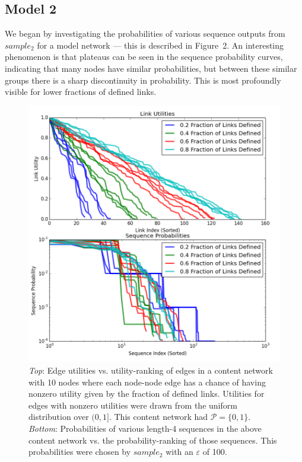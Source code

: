 \documentclass[preprint2]{aastex}
\begin{document}
\subsection{Model 2}

We began by investigating the probabilities of various sequence outputs from \(sample_2\) for a model network --- this is described in Figure~2. An interesting phenomenon is that plateaus can be seen in the sequence probability curves, indicating that many nodes have similar probabilities, but between these similar groups there is a sharp discontinuity in probability. This is most profoundly visible for lower fractions of defined links. 

\begin{figure}[H]
\vspace{-0.24cm}
\centering
\hspace*{-0.5cm}\includegraphics[width=1.1\textwidth]{varying_fraction_of_links_defined.png}
\caption{\emph{Top}: Edge utilities vs. utility-ranking of edges in a content network with 10 nodes where each node-node edge has a chance of having nonzero utility given by the fraction of defined links. Utilities for edges with nonzero utilities were drawn from the uniform distribution over \((0,1]\). This content network had \(\mathcal{P} = \{0, 1\}\). \\
\emph{Bottom}: Probabilities of various length-4 sequences in the above content network vs. the probability-ranking of those sequences. This probabilities were chosen by \(sample_2\) with an \(\varepsilon\) of 100.}
\end{figure}
\end{document}
